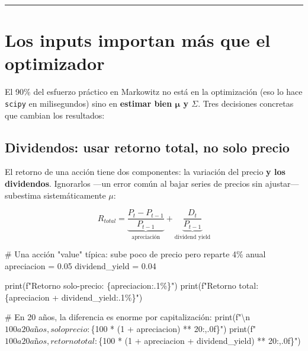 \documentclass[
  spanish,
  letterpaper,
  DIV=11,
  numbers=noendperiod]{scrreprt}
\newenvironment{Shaded}{\begin{snugshade}}{\end{snugshade}}
\newcommand{\BuiltInTok}[1]{\textcolor[rgb]{0.00,0.23,0.31}{#1}}
\newcommand{\CharTok}[1]{\textcolor[rgb]{0.13,0.47,0.30}{#1}}
\newcommand{\CommentTok}[1]{\textcolor[rgb]{0.37,0.37,0.37}{#1}}
\newcommand{\DecValTok}[1]{\textcolor[rgb]{0.68,0.00,0.00}{#1}}
\newcommand{\FloatTok}[1]{\textcolor[rgb]{0.68,0.00,0.00}{#1}}
\newcommand{\NormalTok}[1]{\textcolor[rgb]{0.00,0.23,0.31}{#1}}
\newcommand{\OperatorTok}[1]{\textcolor[rgb]{0.37,0.37,0.37}{#1}}
\newcommand{\SpecialCharTok}[1]{\textcolor[rgb]{0.37,0.37,0.37}{#1}}
\newcommand{\SpecialStringTok}[1]{\textcolor[rgb]{0.13,0.47,0.30}{#1}}
\begin{document}
\begin{center}\rule{0.5\linewidth}{0.5pt}\end{center}

\chapter{Los inputs importan más que el
optimizador}\label{los-inputs-importan-muxe1s-que-el-optimizador}

El 90\% del esfuerzo práctico en Markowitz no está en la optimización
(eso lo hace \texttt{scipy} en milisegundos) sino en \textbf{estimar
bien \(\boldsymbol{\mu}\) y \(\Sigma\)}. Tres decisiones concretas que
cambian los resultados:

\section{Dividendos: usar retorno total, no solo
precio}\label{dividendos-usar-retorno-total-no-solo-precio}

El retorno de una acción tiene dos componentes: la variación del precio
\textbf{y los dividendos}. Ignorarlos ---un error común al bajar series
de precios sin ajustar--- subestima sistemáticamente \(\mu\):

\[R_{total} = \underbrace{\frac{P_t - P_{t-1}}{P_{t-1}}}_{\text{apreciación}} + \underbrace{\frac{D_t}{P_{t-1}}}_{\text{dividend yield}}\]

\label{dividendos}
\begin{Shaded}
\begin{Highlighting}[]
\CommentTok{\# Una acción "value" típica: sube poco de precio pero reparte 4\% anual}
\NormalTok{apreciacion }\OperatorTok{=} \FloatTok{0.05}
\NormalTok{dividend\_yield }\OperatorTok{=} \FloatTok{0.04}

\BuiltInTok{print}\NormalTok{(}\SpecialStringTok{f"Retorno solo{-}precio: }\SpecialCharTok{\{}\NormalTok{apreciacion}\SpecialCharTok{:.1\%\}}\SpecialStringTok{"}\NormalTok{)}
\BuiltInTok{print}\NormalTok{(}\SpecialStringTok{f"Retorno total:       }\SpecialCharTok{\{}\NormalTok{apreciacion }\OperatorTok{+}\NormalTok{ dividend\_yield}\SpecialCharTok{:.1\%\}}\SpecialStringTok{"}\NormalTok{)}

\CommentTok{\# En 20 años, la diferencia es enorme por capitalización:}
\BuiltInTok{print}\NormalTok{(}\SpecialStringTok{f"}\CharTok{\textbackslash{}n}\SpecialStringTok{$100 a 20 años, solo precio:   $}\SpecialCharTok{\{}\DecValTok{100} \OperatorTok{*}\NormalTok{ (}\DecValTok{1} \OperatorTok{+}\NormalTok{ apreciacion) }\OperatorTok{**} \DecValTok{20}\SpecialCharTok{:,.0f\}}\SpecialStringTok{"}\NormalTok{)}
\BuiltInTok{print}\NormalTok{(}\SpecialStringTok{f"$100 a 20 años, retorno total: $}\SpecialCharTok{\{}\DecValTok{100} \OperatorTok{*}\NormalTok{ (}\DecValTok{1} \OperatorTok{+}\NormalTok{ apreciacion }\OperatorTok{+}\NormalTok{ dividend\_yield) }\OperatorTok{**} \DecValTok{20}\SpecialCharTok{:,.0f\}}\SpecialStringTok{"}\NormalTok{)}
\end{Highlighting}
\end{Shaded}
\end{document}

